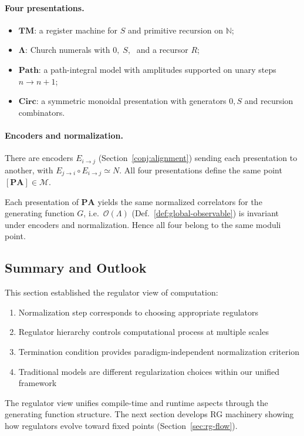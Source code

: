 \paragraph{Four presentations.}
\begin{itemize}
\item $\mathbf{TM}$: a register machine for $S$ and primitive recursion on $\mathbb{N}$;
\item $\mathbf{\Lambda}$: Church numerals with $0,\;S,\;$ and a recursor $R$;
\item $\mathbf{Path}$: a path-integral model with amplitudes supported on unary steps $n\to n+1$;
\item $\mathbf{Circ}$: a symmetric monoidal presentation with generators $0,S$ and recursion combinators.
\end{itemize}

\paragraph{Encoders and normalization.}
There are encoders $E_{i\to j}$ (Section~\ref{conj:alignment}) sending each presentation to another,
with $E_{j\to i}\circ E_{i\to j}\simeq N$.
All four presentations define the same point $[\mathbf{PA}]\in\mathcal{M}$.

\begin{proposition}
Each presentation of $\mathbf{PA}$ yields the same normalized correlators for
the generating function $G$, i.e.\ $\mathcal{O}(\Lambda)$ (Def.~\ref{def:global-observable})
is invariant under encoders and normalization. Hence all four belong to the same moduli point.
\end{proposition}

\subsection{Summary and Outlook}

This section established the regulator view of computation:

\begin{enumerate}
\item Normalization step corresponds to choosing appropriate regulators
\item Regulator hierarchy controls computational process at multiple scales
\item Termination condition provides paradigm-independent normalization criterion
\item Traditional models are different regularization choices within our unified framework
\end{enumerate}

The regulator view unifies compile-time and runtime aspects through the generating function structure. The next section develops RG machinery showing how regulators evolve toward fixed points (Section~\ref{sec:rg-flow}).